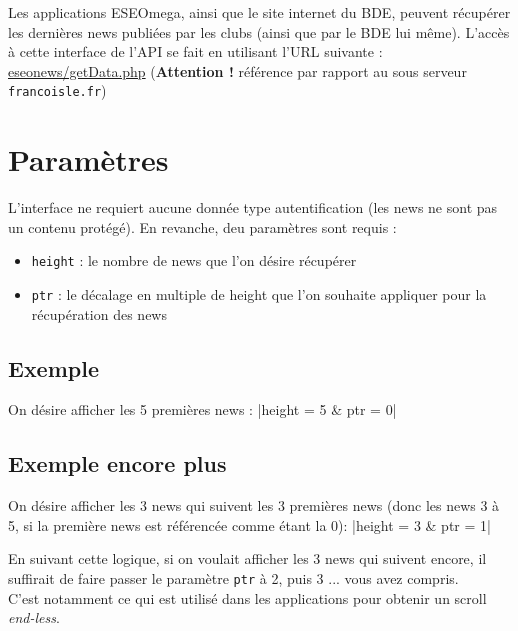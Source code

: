 \documentclass[12pt,a4paper,oneside]{report}
\begin{document}
Les applications ESEOmega, ainsi que le site internet du BDE, peuvent récupérer les dernières news publiées par les clubs (ainsi que par le BDE lui même). L'accès à cette interface de l'API se fait en utilisant l'URL suivante :\\

\noindent \url{eseonews/getData.php} (\textbf{Attention !} référence par rapport au sous serveur \texttt{francoisle.fr})

\section{Paramètres}

L'interface ne requiert aucune donnée type autentification (les news ne sont pas un contenu protégé). En revanche, deu paramètres sont requis :

\begin{itemize}
\item \texttt{height} : le nombre de news que l'on désire récupérer
\item \texttt{ptr} : le décalage en multiple de height que l'on souhaite appliquer pour la récupération des news
\end{itemize}

\subsection{Exemple}

On désire afficher les 5 premières news : |height = 5 & ptr = 0|

\subsection{Exemple encore plus}

On désire afficher les 3 news qui suivent les 3 premières news (donc les news 3 à 5, si la première news est référencée comme étant la 0): |height = 3 & ptr = 1|

\noindent En suivant cette logique, si on voulait afficher les 3 news qui suivent encore, il suffirait de faire passer le paramètre \texttt{ptr} à 2, puis 3 ... vous avez compris.\\

\noindent C'est notamment ce qui est utilisé dans les applications pour obtenir un scroll \textsl{end-less}.
\end{document}
